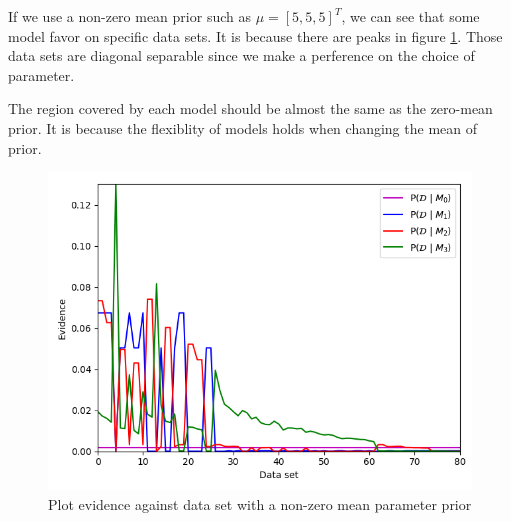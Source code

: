 \documentclass[12pt]{article}
\newenvironment{question}[2][Question]{\begin{trivlist}
\kern10pt
\item[\hskip \labelsep {\bfseries #1}\hskip \labelsep {\bfseries #2.}]}{\end{trivlist}}
\begin{document}
\begin{question}{24}
If we use a non-zero mean prior such as $\mu = [5, 5, 5]^T$, we can see that
some model favor on specific data sets. It is because there are peaks in figure
\ref{fig:Q24-non-zero-plotEvid}. Those data sets are diagonal separable since 
we make a perference on the choice of parameter.

The region covered by each model should be almost the same as the zero-mean prior.
It is because the flexiblity of models holds when changing the mean of prior.
  
  \begin{figure}[h] 
    \centering
    \includegraphics[width=0.5\linewidth]{fig/Q24-non-zero-mean-sub.png}
    \caption{Plot evidence against data set with a non-zero mean parameter prior}
    \label{fig:Q24-non-zero-plotEvid}
  \end{figure}
\end{question}
\end{document}
